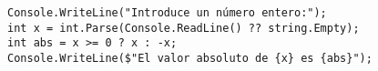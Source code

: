 \begin{lstlisting}
Console.WriteLine("Introduce un número entero:");
int x = int.Parse(Console.ReadLine() ?? string.Empty);
int abs = x >= 0 ? x : -x;
Console.WriteLine($"El valor absoluto de {x} es {abs}");
\end{lstlisting}